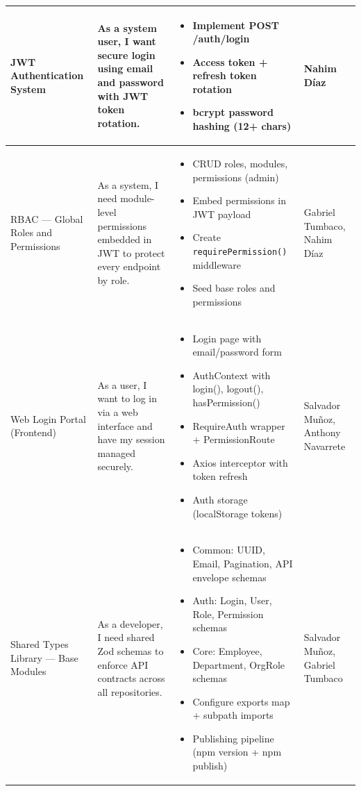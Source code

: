 \documentclass[letterpaper%
, oneside%
, 12pt%
, memoireprojet%
, english%
,creativecommons,hyperref, withAlgo2e %
]{thETS}
\begin{document}
\begin{longtable}{|p{3.0cm}|p{4.6cm}|p{5.6cm}|p{3.0cm}|}
JWT Authentication System & As a system user, I want secure login using email and password with JWT token rotation. & \begin{itemize}\setlength{\itemsep}{2pt}
    \item Implement POST /auth/login
    \item Access token + refresh token rotation
    \item bcrypt password hashing (12+ chars)
\end{itemize} & Nahim Díaz \\ \hline

RBAC — Global Roles and Permissions & As a system, I need module-level permissions embedded in JWT to protect every endpoint by role. & \begin{itemize}\setlength{\itemsep}{2pt}
    \item CRUD roles, modules, permissions (admin)
    \item Embed permissions in JWT payload
    \item Create \texttt{requirePermission()} middleware
    \item Seed base roles and permissions
\end{itemize} & Gabriel Tumbaco, Nahim Díaz \\ \hline

Web Login Portal (Frontend) & As a user, I want to log in via a web interface and have my session managed securely. & \begin{itemize}\setlength{\itemsep}{2pt}
    \item Login page with email/password form
    \item AuthContext with login(), logout(), hasPermission()
    \item RequireAuth wrapper + PermissionRoute
    \item Axios interceptor with token refresh
    \item Auth storage (localStorage tokens)
\end{itemize} & Salvador Muñoz, Anthony Navarrete \\ \hline

Shared Types Library — Base Modules & As a developer, I need shared Zod schemas to enforce API contracts across all repositories. & \begin{itemize}\setlength{\itemsep}{2pt}
    \item Common: UUID, Email, Pagination, API envelope schemas
    \item Auth: Login, User, Role, Permission schemas
    \item Core: Employee, Department, OrgRole schemas
    \item Configure exports map + subpath imports
    \item Publishing pipeline (npm version + npm publish)
\end{itemize} & Salvador Muñoz, Gabriel Tumbaco \\ \hline


\end{longtable}
\end{document}
